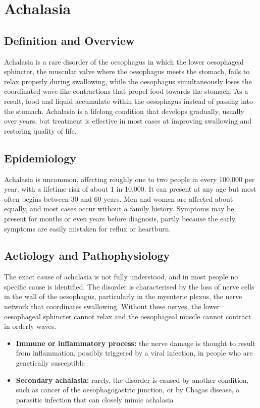 \chapter{Achalasia}

\section*{Definition and Overview}
Achalasia is a rare disorder of the oesophagus in which the lower oesophageal sphincter, the muscular valve where the oesophagus meets the stomach, fails to relax properly during swallowing, while the oesophagus simultaneously loses the coordinated wave-like contractions that propel food towards the stomach. As a result, food and liquid accumulate within the oesophagus instead of passing into the stomach. Achalasia is a lifelong condition that develops gradually, usually over years, but treatment is effective in most cases at improving swallowing and restoring quality of life.

\section*{Epidemiology}
Achalasia is uncommon, affecting roughly one to two people in every 100,000 per year, with a lifetime risk of about 1 in 10,000. It can present at any age but most often begins between 30 and 60 years. Men and women are affected about equally, and most cases occur without a family history. Symptoms may be present for months or even years before diagnosis, partly because the early symptoms are easily mistaken for reflux or heartburn.

\section*{Aetiology and Pathophysiology}
The exact cause of achalasia is not fully understood, and in most people no specific cause is identified. The disorder is characterised by the loss of nerve cells in the wall of the oesophagus, particularly in the myenteric plexus, the nerve network that coordinates swallowing. Without these nerves, the lower oesophageal sphincter cannot relax and the oesophageal muscle cannot contract in orderly waves.

\begin{itemize}
    \item \textbf{Immune or inflammatory process:} the nerve damage is thought to result from inflammation, possibly triggered by a viral infection, in people who are genetically susceptible
    \item \textbf{Secondary achalasia:} rarely, the disorder is caused by another condition, such as cancer of the oesophagogastric junction, or by Chagas disease, a parasitic infection that can closely mimic achalasia
\end{itemize}

